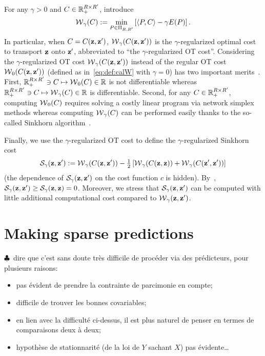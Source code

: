 For any $\gamma > 0$ and $C \in \mathbb{R}_{+}^{R\times R'}$, introduce
\begin{equation}
  \label{eq:def:calW}
  \operatorname{\mathcal{W}}_{\gamma}(C)  :=  \min_{P   \in  \Pi_{R,R'}}  \left[\langle  P,
    C \rangle - \gamma E(P)\right].
\end{equation}
In particular,  when $C  = C(\textbf{z},\textbf{z}')$, $\operatorname{\mathcal{W}}_{\gamma}(C(\textbf{z},\textbf{z}'))$  is the
$\gamma$-regularized optimal cost to  transport $\textbf{z}$ onto $\textbf{z}'$, abbreviated
to ``the $\gamma$-regularized OT cost''.  Considering the $\gamma$-regularized
OT  cost   $\operatorname{\mathcal{W}}_{\gamma}(C(\textbf{z},\textbf{z}'))$  instead  of  the   regular  OT  cost
$\operatorname{\mathcal{W}}_{0}(C(\textbf{z},\textbf{z}'))$ (defined  as in~\eqref{eq:def:calW}  with $\gamma=0$)
has  two  important  merits~\cite[Chapters 3,  4,  9]{peyre2020computational}.
First,  $\mathbb{R}_{+}^{R\times R'}  \ni C  \mapsto \operatorname{\mathcal{W}}_{0}(C)  \in \mathbb{R}$  is not
differentiable                                                         whereas
$\mathbb{R}_{+}^{R\times   R'}  \ni   C\mapsto   \operatorname{\mathcal{W}}_{\gamma}(C)   \in  \mathbb{R}$   is
differentiable.   Second, for  any  $C \in  \mathbb{R}_{+}^{R\times R'}$,  computing
$\operatorname{\mathcal{W}}_{0}(C)$ requires  solving a costly  linear program via  network simplex
methods whereas  computing $\operatorname{\mathcal{W}}_{\gamma}(C)$ can be  performed easily thanks
to the so-called Sinkhorn algorithm~\cite{NIPS2013_af21d0c9}.

Finally,   we   use  the   $\gamma$-regularized   OT   cost  to   define   the
$\gamma$-regularized Sinkhorn cost
\begin{equation*}
  \mathcal{S}_{\gamma}(\textbf{z},\textbf{z}')       :=        \operatorname{\mathcal{W}}_{\gamma}(C(\textbf{z},\textbf{z}'))       -
  \tfrac{1}{2}\left[\operatorname{\mathcal{W}}_{\gamma}(C(\textbf{z},\textbf{z}))                               +
    \operatorname{\mathcal{W}}_{\gamma}(C(\textbf{z}',\textbf{z}'))\right]
\end{equation*}
(the  dependence of  $\mathcal{S}_{\gamma}(\textbf{z},\textbf{z}')$ on  the cost  function $c$  is
hidden).                         By~\citep[Theorem~1]{feydy2018interpolating},
$\mathcal{S}_{\gamma} (\textbf{z},\textbf{z}')  \geq \mathcal{S}_{\gamma} (\textbf{z},\textbf{z}) =  0$.  Moreover, we
stress that $\mathcal{S}_{\gamma} (\textbf{z},\textbf{z}')$ can be computed with little additional
computational cost compared to $\operatorname{\mathcal{W}}_{\gamma} (\textbf{z},\textbf{z}')$.


\section{Making sparse predictions}
\label{sec:sparse:regression}

$\clubsuit$~dire  que c'est  sans doute  très  difficile de  procéder via  des
prédicteurs, pour plusieurs raisons:
\begin{itemize}
\item pas évident de prendre la contrainte de parcimonie en compte;
\item difficile de trouver les bonnes covariables;
\item en lien avec  la difficulté ci-dessus, il est plus  naturel de penser en
  termes de comparaisons deux à deux;
\item  hypothèse  de  stationnarité  (de  la  loi  de  $Y$  sachant  $X$)  pas
  évidente\ldots 
\end{itemize}

